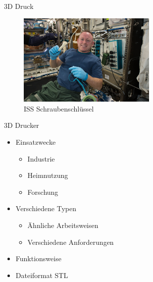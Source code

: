 \begin{frame}{3D Druck}
    \begin{minipage}[b]{.6\textwidth}
    \begin{figure}
        \centering
        \includegraphics[width=190pt]{img_niklas/iss_wrench.jpg}
        \caption*{ISS Schraubenschlüssel}
        \label{fig:my_label}
    \end{figure}
    \end{minipage}
    \hfill
    \begin{minipage}[b]{.39\textwidth}
    \begin{block}{3D Drucker}
        \begin{itemize}
            \item Einsatzwecke
            \begin{itemize}
                \item Industrie
                \item Heimnutzung
                \item Forschung
            \end{itemize}
            \item Verschiedene Typen
            \begin{itemize}
                \item Ähnliche Arbeitsweisen
                \item Verschiedene Anforderungen
            \end{itemize}
            \item Funktionsweise
            \item Dateiformat STL
        \end{itemize}
    \end{block}
    \end{minipage}
    
\end{frame}

